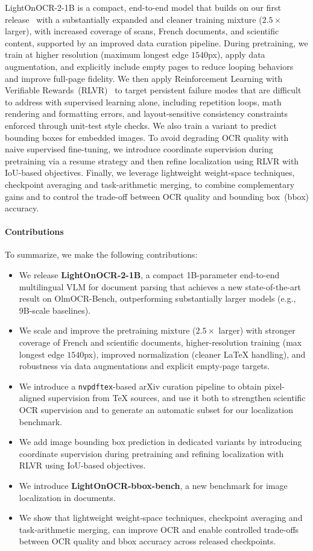\documentclass{article}
\begin{document}
LightOnOCR-2-1B is a compact, end-to-end model that builds on our first release~\cite{blogpostv1} with a substantially expanded and cleaner training mixture ($2.5\times$ larger), with increased coverage of scans, French documents, and scientific content, supported by an improved data curation pipeline. During pretraining, we train at higher resolution (maximum longest edge $1540$px), apply data augmentation, and explicitly include empty pages to reduce looping behaviors and improve full-page fidelity. We then apply Reinforcement Learning with Verifiable Rewards~(RLVR)~\cite{Lambert2024TLU3P} to target persistent failure modes that are difficult to address with supervised learning alone, including repetition loops, math rendering and formatting errors, and layout-sensitive consistency constraints enforced through unit-test style checks. We also train a variant to predict bounding boxes for embedded images. To avoid degrading OCR quality with naive supervised fine-tuning, we introduce coordinate supervision during pretraining via a resume strategy and then refine localization using RLVR with IoU-based objectives. Finally, we leverage lightweight weight-space techniques, checkpoint averaging and task-arithmetic merging, to combine complementary gains and to control the trade-off between OCR quality and bounding box~(bbox) accuracy.

\paragraph{Contributions}
To summarize, we make the following contributions:
\begin{itemize}
    \item We release \textbf{LightOnOCR-2-1B}, a compact 1B-parameter end-to-end multilingual VLM for document parsing that achieves a new state-of-the-art result on OlmOCR-Bench, outperforming substantially larger models (e.g., 9B-scale baselines).
    \item We scale and improve the pretraining mixture ($2.5\times$ larger) with stronger coverage of French and scientific documents, higher-resolution training (max longest edge $1540$px), improved normalization (cleaner \LaTeX{} handling), and robustness via data augmentations and explicit empty-page targets.
    \item We introduce a \texttt{nvpdftex}-based arXiv curation pipeline to obtain pixel-aligned supervision from \TeX{} sources, and use it both to strengthen scientific OCR supervision and to generate an automatic subset for our localization benchmark.
    \item We add image bounding box prediction in dedicated variants by introducing coordinate supervision during pretraining and refining localization with RLVR using IoU-based objectives.
    \item We introduce \textbf{LightOnOCR-bbox-bench}, a new benchmark for image localization in documents.
    \item We show that lightweight weight-space techniques, checkpoint averaging and task-arithmetic merging, can improve OCR and enable controlled trade-offs between OCR quality and bbox accuracy across released checkpoints.
\end{itemize}
\end{document}
